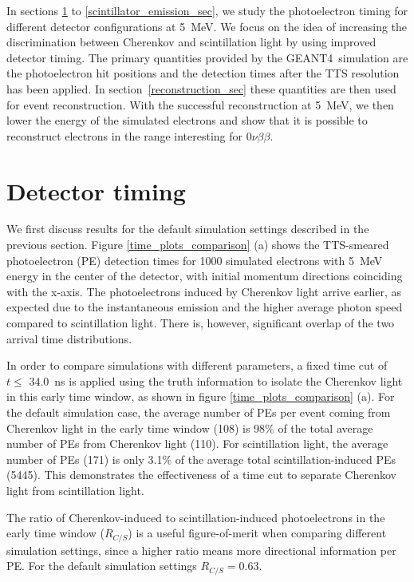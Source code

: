 \documentclass[cits]{JINST}
\newcommand{\GEANT}{GEANT4}
\begin{document}
In sections \ref{detector_timing_sec} to
\ref{scintillator_emission_sec}, we study the
photoelectron timing for different detector configurations at 5~MeV. We focus
on the idea of increasing the discrimination between Cherenkov and
scintillation light by using improved detector timing. The primary
quantities provided by the \GEANT~simulation are the photoelectron hit
positions and the detection times after the TTS resolution has been
applied. In section~\ref{reconstruction_sec} these quantities are then
used for event reconstruction. With the successful reconstruction at 5~MeV, we then lower the energy of the simulated electrons and show that it is possible to reconstruct electrons in the range interesting for $0\nu\beta\beta$.

\section{Detector timing}
\label{detector_timing_sec}

We first discuss results for the default simulation settings described
in the previous section. Figure \ref{time_plots_comparison} (a) shows
the TTS-smeared photoelectron (PE) detection times for 1000 simulated
electrons with 5~MeV energy in the center of the detector, with initial
momentum directions coinciding with the x-axis. The photoelectrons
induced by Cherenkov light arrive earlier, as expected due to the
instantaneous emission and the higher average photon speed compared to
scintillation light. There is, however, significant overlap of the two
arrival time distributions.

In order to compare simulations with different parameters, a fixed
time cut of $t\leq$ 34.0~ns is applied using the truth information to
isolate the Cherenkov light in this early time window, as shown in figure \ref{time_plots_comparison} (a). For the default
simulation case, the average number of PEs per event coming from
Cherenkov light in the early time window (108) is 98\% of the total
average number of PEs from Cherenkov light (110). For scintillation
light, the average number of PEs (171) is only 3.1\% of the average total
scintillation-induced PEs (5445). This demonstrates the effectiveness of
a time cut to separate Cherenkov light from scintillation light. 

The ratio of Cherenkov-induced to scintillation-induced photoelectrons
in the early time window ($R_{C/S}$) is a useful figure-of-merit when
comparing different simulation settings, since a higher ratio means
more directional information per PE. For the default simulation
settings $R_{C/S}=0.63$.
\end{document}
